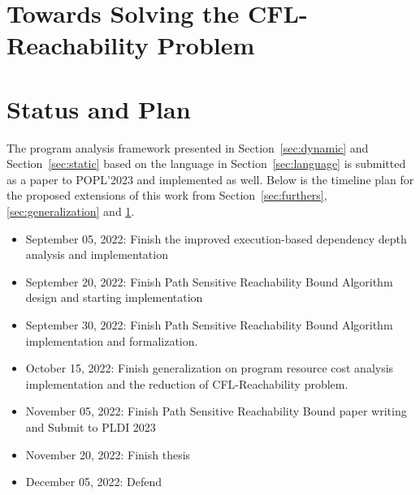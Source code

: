 \documentclass[a4paper,11pt]{article}
\begin{document}
\section{Towards Solving the CFL-Reachability Problem}
\label{sec:cfl_reduction}


\section{Status and Plan}
The program analysis framework presented in Section~\ref{sec:dynamic} and Section~\ref{sec:static} 
based on the language in Section~\ref{sec:language}
 is submitted as a paper to POPL'2023 and implemented as well. 
 Below is the timeline plan for the proposed extensions of this work
 from Section~\ref{sec:furthers}, \ref{sec:generalization} and \ref{sec:cfl_reduction}.
\begin{itemize}
\item September 05, 2022: Finish the improved execution-based dependency depth analysis and implementation
\item September 20, 2022: Finish Path Sensitive Reachability Bound Algorithm design and starting implementation
\item September 30, 2022: Finish Path Sensitive Reachability Bound Algorithm implementation and formalization.
\item October 15, 2022:  Finish generalization on program resource cost analysis implementation 
and the reduction of CFL-Reachability problem.
\item November 05, 2022: Finish Path Sensitive Reachability Bound paper writing and Submit to PLDI 2023
\item November 20, 2022: Finish thesis
\item December 05, 2022: Defend
\end{itemize}




\end{document}
